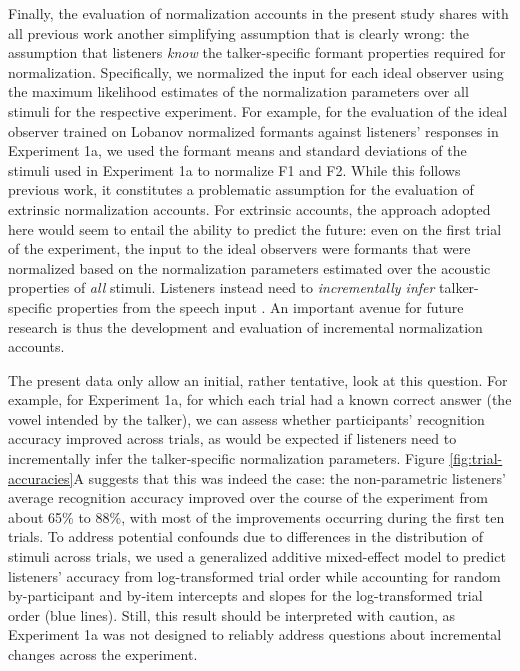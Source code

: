 \documentclass[preprint]{JASA}
\begin{document}
Finally, the evaluation of normalization accounts in the present study shares with all previous work \citep[e.g.,][]{apfelbaum-mcmurray2015, cole2010, mcmurray-jongman2011, barreda2021, nearey1989, richter2017} another simplifying assumption that is clearly wrong: the assumption that listeners \emph{know} the talker-specific formant properties required for normalization. Specifically, we normalized the input for each ideal observer using the maximum likelihood estimates of the normalization parameters over all stimuli for the respective experiment. For example, for the evaluation of the ideal observer trained on Lobanov normalized formants against listeners' responses in Experiment 1a, we used the formant means and standard deviations of the stimuli used in Experiment 1a to normalize F1 and F2. While this follows previous work, it constitutes a problematic assumption for the evaluation of extrinsic normalization accounts. For extrinsic accounts, the approach adopted here would seem to entail the ability to predict the future: even on the first trial of the experiment, the input to the ideal observers were formants that were normalized based on the normalization parameters estimated over the acoustic properties of \emph{all} stimuli. Listeners instead need to \emph{incrementally infer} talker-specific properties from the speech input \citep{barreda-jaeger2024, nearey-assmann2007, xie2023}. An important avenue for future research is thus the development and evaluation of incremental normalization accounts.

The present data only allow an initial, rather tentative, look at this question. For example, for Experiment 1a, for which each trial had a known correct answer (the vowel intended by the talker), we can assess whether participants' recognition accuracy improved across trials, as would be expected if listeners need to incrementally infer the talker-specific normalization parameters. Figure \ref{fig:trial-accuracies}A suggests that this was indeed the case: the non-parametric listeners' average recognition accuracy improved over the course of the experiment from about 65\% to 88\%, with most of the improvements occurring during the first ten trials. To address potential confounds due to differences in the distribution of stimuli across trials, we used a generalized additive mixed-effect model to predict listeners' accuracy from log-transformed trial order while accounting for random by-participant and by-item intercepts and slopes for the log-transformed trial order (blue lines). Still, this result should be interpreted with caution, as Experiment 1a was not designed to reliably address questions about incremental changes across the experiment.
\end{document}
